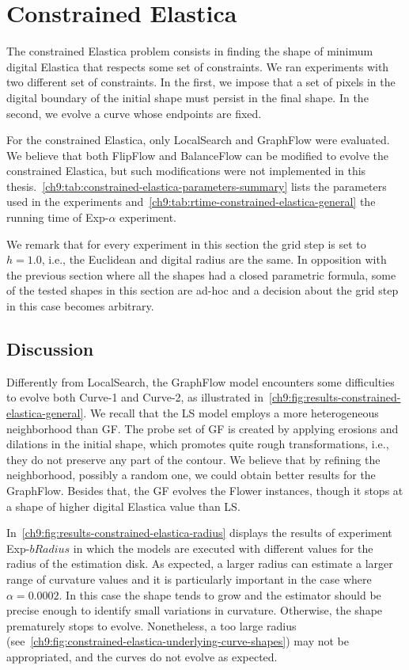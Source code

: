 \section{Constrained Elastica}

The constrained Elastica problem consists in finding the shape of minimum digital Elastica that respects some set of constraints. We ran experiments with two different set of constraints. In the first, we impose that a set of pixels in the digital boundary of the initial shape must persist in the final shape. In the second, we evolve a curve whose endpoints are fixed. 

For the constrained Elastica, only LocalSearch and GraphFlow were evaluated. We believe that both FlipFlow and BalanceFlow can be modified to evolve the constrained Elastica, but such modifications were not implemented in this thesis.~\cref{ch9:tab:constrained-elastica-parameters-summary} lists the parameters used in the experiments and~\cref{ch9:tab:rtime-constrained-elastica-general} the running time of Exp-$\alpha$ experiment.

We remark that for every experiment in this section the grid step is set to $h=1.0$, i.e., the Euclidean and digital radius are the same. In opposition with the previous section where all the shapes had a closed parametric formula, some of the tested shapes in this section are ad-hoc and a decision about the grid step in this case becomes arbitrary.

\subsection{Discussion}

Differently from LocalSearch, the GraphFlow model encounters some difficulties to evolve both Curve-1 and Curve-2, as illustrated in~\cref{ch9:fig:results-constrained-elastica-general}. We recall that the LS model employs a more heterogeneous neighborhood than GF. The probe set of GF is created by applying erosions and dilations in the initial shape, which promotes quite rough transformations, i.e., they do not preserve any part of the contour. We believe that by refining the neighborhood, possibly a random one, we could obtain better results for the GraphFlow. Besides that, the GF evolves the Flower instances, though it stops at a shape of higher digital Elastica value than LS.

In~\cref{ch9:fig:results-constrained-elastica-radius} displays the results of experiment Exp-$bRadius$ in which the models are executed with different values for the radius of the estimation disk. As expected, a larger radius can estimate a larger range of curvature values and it is particularly important in the case where $\alpha=0.0002$. In this case the shape tends to grow and the estimator should be precise enough to identify small variations in curvature. Otherwise, the shape prematurely stops to evolve. Nonetheless, a too large radius (see~\cref{ch9:fig:constrained-elastica-underlying-curve-shapes}) may not be appropriated, and the curves do not evolve as expected.


